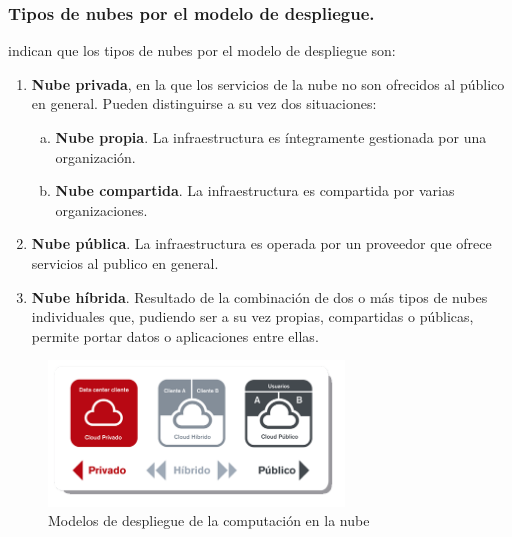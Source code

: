 \subsubsection{Tipos de nubes por el modelo de despliegue.}
\cite{nist} indican que los tipos de nubes por el modelo de despliegue son:
\begin{enumerate}
    \item \textbf{Nube privada}, en  la  que  los  servicios  de la nube no son
          ofrecidos  al  público  en  general. Pueden distinguirse a su vez dos
          situaciones:
          \begin{enumerate}[a.]
              \item \textbf{Nube propia}. La infraestructura es íntegramente gestionada
                    por una organización.
              \item \textbf{Nube compartida}. La  infraestructura  es  compartida  por
                    varias organizaciones.
          \end{enumerate}
    \item \textbf{Nube pública}. La  infraestructura  es  operada  por  un
          proveedor  que  ofrece  servicios al publico en general.
    \item \textbf{Nube híbrida}. Resultado de la combinación de dos o más tipos de nubes
          individuales que, pudiendo ser a su vez propias, compartidas o públicas,
          permite portar datos o aplicaciones entre ellas.
\end{enumerate}

\begin{figure}[h]
    \centering
    \captionsetup{justification=centering}
    \includegraphics[width=0.7\textwidth]{Imagenes/Bitmap/cloud0}
    \caption{Modelos de despliegue de la computación en la nube}
    \label{fig:cloud1}
\end{figure}

